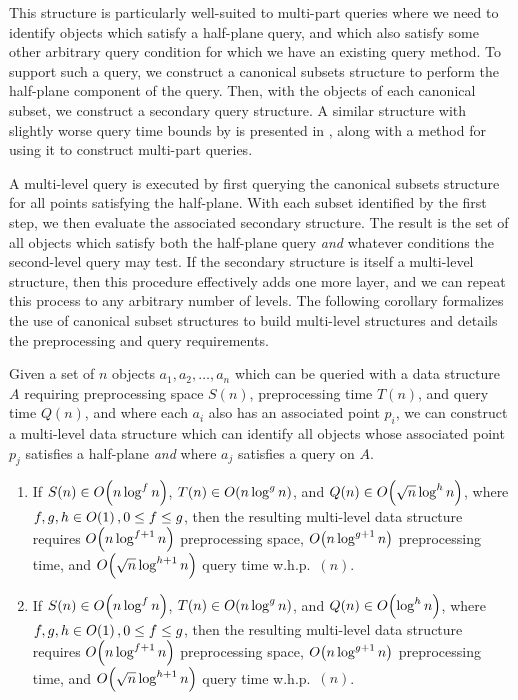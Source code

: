 This structure is particularly well-suited to multi-part queries where we need to identify objects which satisfy a half-plane query, and which also satisfy some other arbitrary query condition for which we have an existing query method.
To support such a query, we construct a canonical subsets structure to perform the half-plane component of the query. 
Then, with the objects of each canonical subset, we construct a secondary query structure.
A similar structure with slightly worse query time bounds by \cite{Matousek92} is presented in \cite{debergch16}, along with a method for using it to construct multi-part queries.

A multi-level query is executed by first querying the canonical subsets structure for all points satisfying the half-plane.
With each subset identified by the first step, we then evaluate the associated secondary structure.
The result is the set of all objects which satisfy both the half-plane query \emph{and} whatever conditions the second-level query may test.
If the secondary structure is itself a multi-level structure, then this procedure effectively adds one more layer, and we can repeat this process to any arbitrary number of levels.
The following corollary formalizes the use of canonical subset structures to build multi-level structures and details the preprocessing and query requirements.


\begin{corollary}
\label{cor:multichan}

Given a set of $n$ objects $a_1, a_2, \ldots, a_n$ which can be queried with a data structure $A$ requiring preprocessing space $S(n)$, preprocessing time $T(n)$, and query time $Q(n)$, and where each $a_i$ also has an associated point $p_i$, we can construct a multi-level data structure which can identify all objects whose associated point $p_j$ satisfies a half-plane  \emph{and} where $a_j$ satisfies a query on $A$.

\begin{enumerate}
\item If $S(n) \in O\!\left(n \log^f{n}\right)$, $T(n) \in O\!\left(n \log^g{n}\right)$, and $Q(n) \in O\!\left(\sqrt{n} \log^h{n}\right)$, where $f, g, h \in O\!\left(1\right), 0 \leq f \leq g$, then the resulting multi-level data structure requires $O\!\left(n\log^{f+1}{n}\right)$ preprocessing space, $O\!\left(n\log^{g+1}{n}\right)$ preprocessing time, and $O\!\left(\sqrt{n}\log^{h+1}{n}\right)$ query time w.h.p.~$(n)$.

\item If $S(n) \in O\!\left(n \log^f{n}\right)$, $T(n) \in O\!\left(n \log^g{n}\right)$, and $Q(n) \in O\!\left(\log^h{n}\right)$, where $f, g, h \in O\!\left(1\right), 0 \leq f \leq g$, then the resulting multi-level data structure requires $O\!\left(n\log^{f+1}{n}\right)$ preprocessing space, $O\!\left(n\log^{g+1}{n}\right)$ preprocessing time, and $O\!\left(\sqrt{n}\log^{h+1}{n}\right)$ query time w.h.p.~$(n)$.

\end{enumerate}
\end{corollary}

